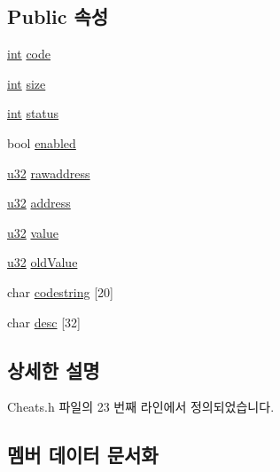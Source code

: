 \subsection*{Public 속성}
\begin{DoxyCompactItemize}
\item 
\mbox{\hyperlink{_util_8cpp_a0ef32aa8672df19503a49fab2d0c8071}{int}} \mbox{\hyperlink{struct_cheats_data_a24cc3911cdbf485ce42b401873e2e269}{code}}
\item 
\mbox{\hyperlink{_util_8cpp_a0ef32aa8672df19503a49fab2d0c8071}{int}} \mbox{\hyperlink{struct_cheats_data_a2e3e50db1415e980fe34da90fdbda02a}{size}}
\item 
\mbox{\hyperlink{_util_8cpp_a0ef32aa8672df19503a49fab2d0c8071}{int}} \mbox{\hyperlink{struct_cheats_data_aeb36cfefe89db53cdb45909d35b9c6e4}{status}}
\item 
bool \mbox{\hyperlink{struct_cheats_data_a99c72fc2074645888a5afe88cfb0fd15}{enabled}}
\item 
\mbox{\hyperlink{_system_8h_a10e94b422ef0c20dcdec20d31a1f5049}{u32}} \mbox{\hyperlink{struct_cheats_data_aa12c1d606385a21c544022d5acb9c95e}{rawaddress}}
\item 
\mbox{\hyperlink{_system_8h_a10e94b422ef0c20dcdec20d31a1f5049}{u32}} \mbox{\hyperlink{struct_cheats_data_a01fd4bf820cf8cb6a4212183b29530cd}{address}}
\item 
\mbox{\hyperlink{_system_8h_a10e94b422ef0c20dcdec20d31a1f5049}{u32}} \mbox{\hyperlink{struct_cheats_data_ab0df909850861e6314b1abb13c6305d1}{value}}
\item 
\mbox{\hyperlink{_system_8h_a10e94b422ef0c20dcdec20d31a1f5049}{u32}} \mbox{\hyperlink{struct_cheats_data_ae53ec4ba23eb94b339cc05b807a944d5}{old\+Value}}
\item 
char \mbox{\hyperlink{struct_cheats_data_a4163c46e82595675cedca34ad19d6f43}{codestring}} \mbox{[}20\mbox{]}
\item 
char \mbox{\hyperlink{struct_cheats_data_a12223e792c360411d694a8e2506dc90e}{desc}} \mbox{[}32\mbox{]}
\end{DoxyCompactItemize}


\subsection{상세한 설명}


Cheats.\+h 파일의 23 번째 라인에서 정의되었습니다.



\subsection{멤버 데이터 문서화}
\mbox{\label{struct_cheats_data_a01fd4bf820cf8cb6a4212183b29530cd}} 

